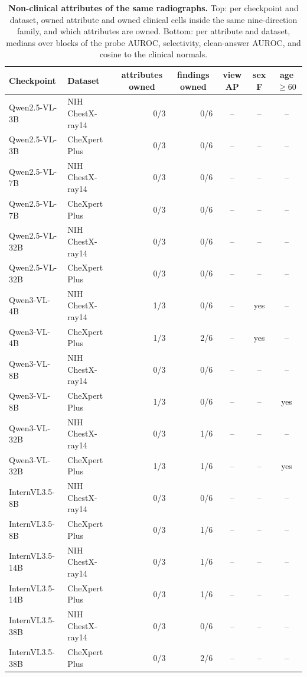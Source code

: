 \begin{table}[htbp]
\centering
\scriptsize
\setlength{\tabcolsep}{4pt}
\caption{\textbf{Non-clinical attributes of the same radiographs.} Top: per checkpoint and dataset, owned attribute and owned clinical cells inside the same nine-direction family, and which attributes are owned. Bottom: per attribute and dataset, medians over blocks of the probe AUROC, selectivity, clean-answer AUROC, and cosine to the clinical normals.}
\label{tab:cf-attr}
\begin{tabular}{llrrccc}
\toprule
Checkpoint & Dataset & \multicolumn{1}{c}{attributes owned} & \multicolumn{1}{c}{findings owned} & \multicolumn{1}{c}{view AP} & \multicolumn{1}{c}{sex F} & \multicolumn{1}{c}{age $\geq60$}\\
\midrule
Qwen2.5-VL-3B & NIH ChestX-ray14 & 0/3 & 0/6 & -- & -- & -- \\
Qwen2.5-VL-3B & CheXpert Plus & 0/3 & 0/6 & -- & -- & -- \\
Qwen2.5-VL-7B & NIH ChestX-ray14 & 0/3 & 0/6 & -- & -- & -- \\
Qwen2.5-VL-7B & CheXpert Plus & 0/3 & 0/6 & -- & -- & -- \\
Qwen2.5-VL-32B & NIH ChestX-ray14 & 0/3 & 0/6 & -- & -- & -- \\
Qwen2.5-VL-32B & CheXpert Plus & 0/3 & 0/6 & -- & -- & -- \\
Qwen3-VL-4B & NIH ChestX-ray14 & 1/3 & 0/6 & -- & yes & -- \\
Qwen3-VL-4B & CheXpert Plus & 1/3 & 2/6 & -- & yes & -- \\
Qwen3-VL-8B & NIH ChestX-ray14 & 0/3 & 0/6 & -- & -- & -- \\
Qwen3-VL-8B & CheXpert Plus & 1/3 & 0/6 & -- & -- & yes \\
Qwen3-VL-32B & NIH ChestX-ray14 & 0/3 & 1/6 & -- & -- & -- \\
Qwen3-VL-32B & CheXpert Plus & 1/3 & 1/6 & -- & -- & yes \\
InternVL3.5-8B & NIH ChestX-ray14 & 0/3 & 0/6 & -- & -- & -- \\
InternVL3.5-8B & CheXpert Plus & 0/3 & 1/6 & -- & -- & -- \\
InternVL3.5-14B & NIH ChestX-ray14 & 0/3 & 1/6 & -- & -- & -- \\
InternVL3.5-14B & CheXpert Plus & 0/3 & 1/6 & -- & -- & -- \\
InternVL3.5-38B & NIH ChestX-ray14 & 0/3 & 0/6 & -- & -- & -- \\
InternVL3.5-38B & CheXpert Plus & 0/3 & 2/6 & -- & -- & -- \\

\end{tabular}
\end{table}
